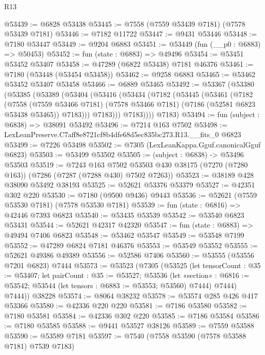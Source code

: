 \begin{lexlean}{R13}
\begin{coremodule}
@53439 := @6828 @53438
@53445 := @7558 (@7559 @53439 @7181) (@7578 @53439 @7181)
@53446 := @7182 @11722
@53447 := @9431 @53446
@53448 := @7180 @53447
@53449 := @9204 @6883
@53451 := @53449 (fun (__p0 : @6883) => @50453)
@53452 := fun (state : @6883) => @49496
@53454 := @53451 @53452 @53407
@53458 := @47289 (@6822 @53438) @7181 @46376
@53461 := @7180 (@53448 (@53454 @53458))
@53462 := @9258 @6883
@53465 := @53462 @53452 @53407 @53458
@53466 := @6889 @53465
@53492 := @53367
    (@53380
      (@53385
        (@53389
          (@53404
            (@53416
              (@53434
                (@7182
                  (@53445
                    (@53461
                      (@7182
                        (@7558
                          (@7559 @53466 @7181)
                          (@7578 @53466 @7181)
                          (@7186 (@52581 @6823 @53438 @53465))
                          @7183)))
                    @7183)))
              @7183))))
      @7183)
@53494 := fun (subject : @6838) => @38091 @53492
@53496 := @7214 @163 @7502
@53498 := LexLeanPreserve.C7aff8e8721cf8b4dfe68d5ec835bc273.R13.__fits_0 @6823
@53499 := @7226 @53498
@53502 := @7305 (LexLeanKappa.Gguf.canonicalGguf @6823)
@53503 := @53499 @53502
@53505 := (subject : @6838) -> @53496 @53503
@53519 := @7243
    @163
    @7502
    @53503
    @430
    @38175
    (@7270 (@7280 @163))
    (@7286 (@7287 (@7288 @430) @7502 @7263))
@53523 := @38189 @428 @38090 @53492 @38193
@53525 := @52621 @53376 @53379
@53527 := @42351 @302 @220
@53530 := @7180 (@9500 @9436) @9443
@53536 := @52621 (@7559 @53530 @7181) (@7578 @53530 @7181)
@53539 := fun (state : @6816) => @42446 @7393 @6823
@53540 := @53435 @53539
@53542 := @53540 @6823 @53431
@53544 := @52621 @42317 @42320
@53547 := fun (state : @6883) => @49494 @7406 @6823
@53548 := @53462 @53547
@53549 := @53548 @7199
@53552 := @47289 @6824 @7181 @46376
@53553 := @53549 @53552
@53555 := @52621 @49386 @49389
@53556 := @52586 @7406
@53560 := @53555 (@53556 @7201 @6823) @7444
@53573 := @53523
    (@7305
      (@53525
        (let tensorCount : @35 := @53407;
        let pairCount : @35 := @53527;
        @53536
          (let «section» : @6816 := @53542; @53544 (let tensors : @6883 := @53553; @53560) @7444)
          @7444)
        @7444))
    @38228
@53574 := @8064 @38232
@53578 := @53574 @285 @426 @417 @53366
@53580 := @42336 @220 @220
@53581 := @7186 @53580
@53582 := @7180 @53581
@53584 := @42336 @302 @220
@53585 := @7186 @53584
@53586 := @7180 @53585
@53588 := @9441 @53527 @38126
@53589 := @7559 @53588
@53590 := @53589 @7181
@53597 := @7540 (@7558 @53590 (@7578 @53588 @7181) @7539 @7183)

\end{coremodule}
\end{lexlean}
